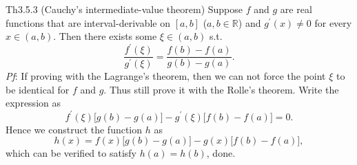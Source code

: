 \documentclass{article}
\begin{document}
\begin{Th}{Th3.5.3 (Cauchy's intermediate-value theorem)}
    Suppose $f$ and $g$ are real functions that are interval-derivable on $[a,b]$ ($a,b\in\mathbb{R}$) and $g^\prime(x)\neq 0$ for every $x\in (a,b)$. Then there exists some $\xi\in (a,b)$ s.t.
    $$ \frac{f^\prime(\xi)}{g^\prime(\xi)} = \frac{f(b)-f(a)}{g(b)-g(a)}. $$
    \tcblower
    \textit{Pf}: If proving with the Lagrange's theorem, then we can not force the point $\xi$ to be identical for $f$ and $g$. Thus still prove it with the Rolle's theorem. Write the expression as
    $$ f^\prime(\xi)\Big[g(b)-g(a)\Big] - g^\prime(\xi)\Big[f(b)-f(a)\Big] = 0. $$
    Hence we construct the function $h$ as
    $$ h(x) = f(x)\Big[g(b)-g(a)\Big] - g(x)\Big[f(b)-f(a)\Big], $$
    which can be verified to satisfy $h(a) = h(b)$, done.
\end{Th}
\end{document}
